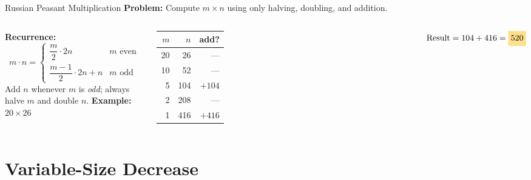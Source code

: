 \documentclass[aspectratio=169]{beamer}
\begin{document}
\begin{frame}[shrink=12]{Russian Peasant Multiplication}
  \textbf{Problem:} Compute $m \times n$ using only halving, doubling, and addition.

  \vspace{0.3em}
  \begin{columns}[T]
      \textbf{Recurrence:}
      \[
        m \cdot n =
        \begin{cases}
          \dfrac{m}{2} \cdot 2n & m \text{ even} \\[6pt]
          \dfrac{m-1}{2} \cdot 2n + n & m \text{ odd}
        \end{cases}
      \]
      \vspace{0.2em}
      Add $n$ whenever $m$ is \emph{odd}; always halve $m$ and double $n$.
      \textbf{Example: $20 \times 26$}
      \vspace{0.2em}

      \begin{tabular}{rrr}
        \toprule
        $m$ & $n$ & add? \\
        \midrule
        20 & 26  & — \\
        10 & 52  & — \\
         5 & 104 & \textcolor{SuccessGreen}{$+104$} \\
         2 & 208 & — \\
         1 & 416 & \textcolor{SuccessGreen}{$+416$} \\
        \bottomrule
      \end{tabular}
      \vspace{0.2em}
      $\text{Result} = 104 + 416 = \highlight{520}$
  \end{columns}
\end{frame}

\section{Variable-Size Decrease}
\end{document}
